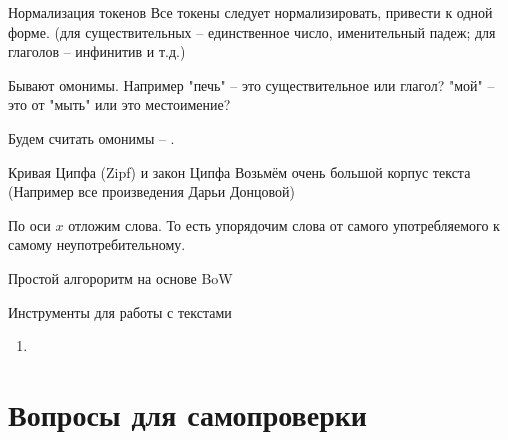 \begin{frame}{Нормализация токенов}
	Все токены следует нормализировать, привести к одной форме. 
	(для существительных -- единственное число, именительный падеж;
	для глаголов -- инфинитив и т.д.)
	
 	Бывают омонимы. Например "печь" -- это существительное или глагол?
	"мой" -- это от "мыть" или это местоимение?
	
	Будем считать омонимы -- .
\end{frame}

\begin{frame}{Кривая Ципфа (Zipf) и закон Ципфа} 
	Возьмём очень большой корпус текста
	(Например все произведения Дарьи Донцовой)

	По оси $x$ отложим  слова.
	То есть упорядочим слова от самого употребляемого к самому неупотребительному.
	
\end{frame}

\begin{frame}{Простой алгороритм на основе BoW}
	
\end{frame}

\begin{frame}{Инструменты для работы с текстами}
	\begin{enumerate}
		\item
	\end{enumerate}

\end{frame}


\section{Вопросы для самопроверки}

